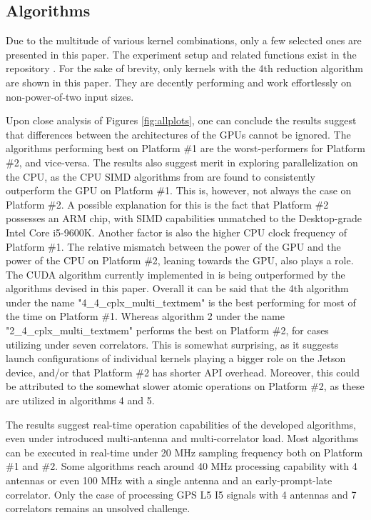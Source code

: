 \documentclass{juliacon}
\begin{document}
\subsection*{Algorithms}
Due to the multitude of various kernel combinations, only a few selected ones are presented in this paper. The experiment setup and related functions exist in the repository \cite{Ozmaden2022}. For the sake of brevity, only kernels with the 4th reduction algorithm are shown in this paper. They are decently performing and work effortlessly on non-power-of-two input sizes. 

Upon close analysis of Figures \ref{fig:allplots}, one can conclude the results suggest that differences between the architectures of the GPUs cannot be ignored. The algorithms performing best on Platform \#1 are the worst-performers for Platform \#2, and vice-versa. The results also suggest merit in exploring parallelization on the CPU, as the CPU SIMD algorithms from \cite{Schoenbrod2022} are found to consistently outperform the GPU on Platform \#1. This is, however, not always the case on Platform \#2. A possible explanation for this is the fact that Platform \#2 possesses an ARM chip, with SIMD capabilities unmatched to the Desktop-grade Intel Core i5-9600K. Another factor is also the higher CPU clock frequency of Platform \#1. The relative mismatch between the power of the GPU and the power of the CPU on Platform \#2, leaning towards the GPU, also plays a role. The CUDA algorithm 
currently implemented in \cite{Schoenbrod2022} is being outperformed by the algorithms devised in this paper. Overall it can be said that the 4th algorithm under the name "4\_4\_cplx\_multi\_textmem" is the best performing for most of the time on Platform \#1. Whereas algorithm 2 under the name "2\_4\_cplx\_multi\_textmem" performs the best on Platform \#2, for cases utilizing under seven correlators. This is somewhat surprising, as it suggests launch configurations of individual kernels playing a bigger role on the Jetson device, and/or that Platform \#2 has shorter API overhead. Moreover, this could be attributed to the somewhat slower atomic operations on Platform \#2, as these are utilized in algorithms 4 and 5.

The results suggest real-time operation capabilities of the developed algorithms, even under introduced multi-antenna and multi-correlator load. Most algorithms can be executed in real-time under 20 MHz sampling frequency both on Platform \#1 and \#2. Some algorithms reach around 40 MHz processing capability with 4 antennas or even 100 MHz with a single antenna and an early-prompt-late correlator. Only the case of processing GPS L5 I5 signals with 4 antennas and 7 correlators remains an unsolved challenge.
\end{document}
